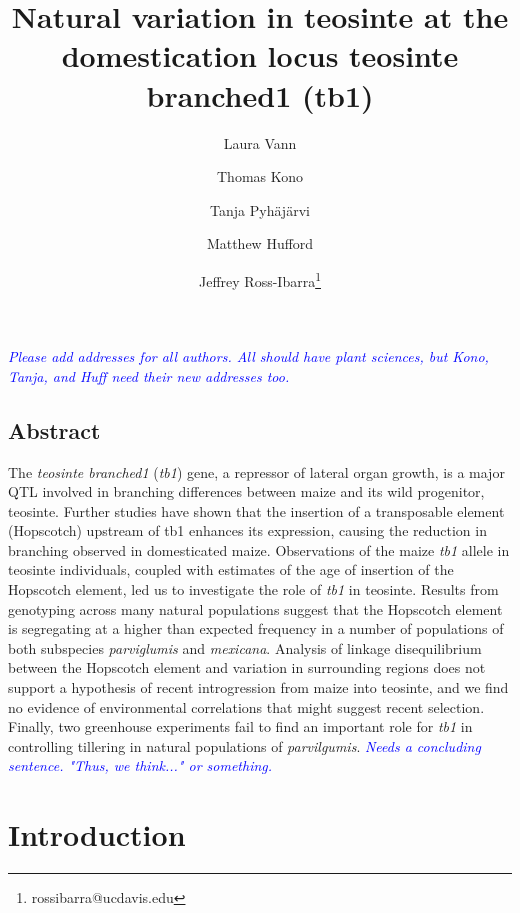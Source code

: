 \documentclass[12pt]{article}
\title{Natural variation in teosinte at the domestication locus teosinte branched1 (tb1)}
\author[1]{Laura Vann}
\author[1]{Thomas Kono}
\author[1]{Tanja Pyh\"aj\"arvi}
\author[1]{Matthew Hufford}
\author[1,2]{Jeffrey Ross-Ibarra\thanks{rossibarra@ucdavis.edu}}
\affil[1]{Department of Plant Sciences, University of California Davis}
\affil[2]{Center for Population Biology and Genome Center, University of California Davis}
\newcommand{\jri}[1]{\textcolor{blue}{ \emph{\scriptsize  #1}} }
\begin{document}
\maketitle

\jri{Please add addresses for all authors.  All should have plant sciences, but Kono, Tanja, and Huff need their new addresses too. }

\clearpage

\subsection*{Abstract}

The \emph{teosinte branched1} (\emph{tb1}) gene, a repressor of lateral organ growth, is a major QTL involved in branching differences between maize and its wild progenitor, teosinte. Further studies have shown that the insertion of a transposable element (Hopscotch) upstream of tb1 enhances its expression, causing the reduction in branching observed in domesticated maize. Observations of the maize \emph{tb1} allele in teosinte individuals, coupled with estimates of the age of insertion of the Hopscotch element, led us to investigate the role of \emph{tb1} in teosinte. Results from genotyping across many natural populations suggest that the Hopscotch element is segregating at a higher than expected frequency in a number of populations of both subspecies \emph{parviglumis} and \emph{mexicana}. Analysis of linkage disequilibrium between the Hopscotch element and variation in surrounding regions does not support a hypothesis of recent introgression from maize into teosinte, and we find no evidence of environmental correlations that might suggest recent selection.  Finally, two greenhouse experiments fail to find an important role for \emph{tb1} in controlling tillering in natural populations of \emph{parvilgumis}. \jri{Needs a concluding sentence. "Thus, we think..." or something.} 

\clearpage

\section*{Introduction}
\end{document}
